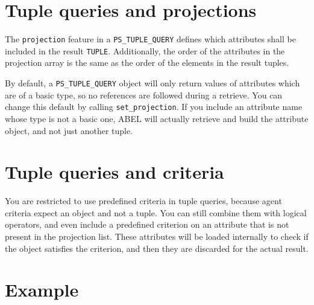 \documentclass[a4paper,12pt]{report}
\begin{document}
\section{Tuple queries and projections}
The \lstinline!projection! feature in a \lstinline!PS_TUPLE_QUERY! defines which attributes shall be included in the result \lstinline!TUPLE!. 
Additionally, the order of the attributes in the projection array is the same as the order of the elements in the result tuples.

By default, a \lstinline!PS_TUPLE_QUERY! object will only return values of attributes which are of a basic type, so no references are followed during a retrieve.
You can change this default by calling \lstinline{set_projection}.
If you include an attribute name whose type is not a basic one, ABEL will actually retrieve and build the attribute object, and not just another tuple.

\section{Tuple queries and criteria}
You are restricted to use predefined criteria in tuple queries, because agent criteria expect an object and not a tuple. 
You can still combine them with logical operators, and even include a predefined criterion on an attribute that is not present in the projection list.
These attributes will be loaded internally to check if the object satisfies the criterion, and then they are discarded for the actual result.

\section {Example}
\end{document}
